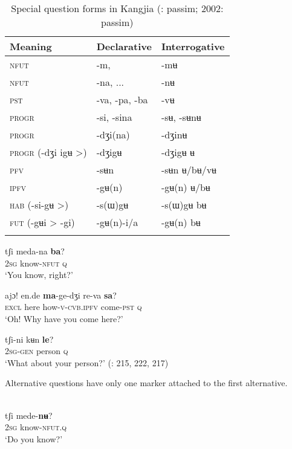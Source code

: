 \begin{table}
\caption{Special question forms in Kangjia (\citealt{Siqinchaoketu1999}: passim; 2002: passim)}
\label{tab:mong:5}

\begin{tabularx}{\textwidth}{XXl}
\lsptoprule

\textbf{Meaning} & \textbf{Declarative} & \textbf{Interrogative}\\
\midrule
\textsc{nfut} & -m, & -mʉ\\
\textsc{nfut} & -na, ... & -nʉ\\
\textsc{pst} & -va, -pa, -ba & -vʉ\\
\textsc{progr} & -si, -sina & -sʉ, -sʉnʉ\\
\textsc{progr} & -dʒi(na) & -dʒinʉ\\
\textsc{progr (}-dʒi igʉ >) & -dʒigʉ & -dʒigʉ ʉ\\
\textsc{pfv} & -sʉn & -sʉn ʉ/bʉ/vʉ\\
\textsc{ipfv} & -gʉ(n) & -gʉ(n) ʉ/bʉ\\
\textsc{hab (}-si-gʉ >) & -s(ɯ)gʉ & -s(ɯ)gʉ bʉ\\
\textsc{fut (}-gʉi > -gi) & -gʉ(n)-i/a & -gʉ(n) bʉ\\
\lspbottomrule
\end{tabularx}
\end{table}

\newpage 
\ea%
    \label{ex:mong:44}
    \ea
    \gll tʃi  meda-na \textbf{{ba}}?\\
    2\textsc{sg}  know-\textsc{nfut}  \textsc{q}\\
    \glt ‘You know, right?’
    
    \ex
    \gll ajɔ!  en.de \textbf{ma}-ge-dʒi    re-va \textbf{{sa}}?\\
    \textsc{excl}  here  how-\textsc{v}-\textsc{cvb.ipfv}  come-\textsc{pst}  \textsc{q}\\
    \glt ‘Oh! Why have you come here?’
    
    \ex
    \gll tʃi-ni    kʉn \textbf{{le}}?\\
    2\textsc{sg}-\textsc{gen}  person  \textsc{q}\\
    \glt ‘What about your person?’ (\citealt{Siqinchaoketu1999}: 215, 222, 217)
    \z
    \z 

Alternative questions have only one marker attached to the first alternative.

\ea%
    \label{ex:mong:45}
    \\
    \ea
    \gll tʃi  mede-\textbf{{nʉ}}?\\
    2\textsc{sg}  know-\textsc{nfut}.\textsc{q}\\
    \glt ‘Do you know?’
    
